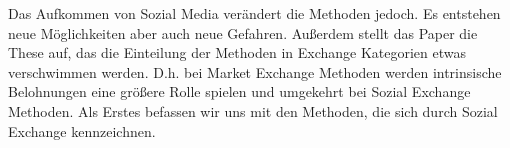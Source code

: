 Das Aufkommen von Sozial Media ver\"andert die Methoden jedoch. Es entstehen neue M\"oglichkeiten aber auch neue Gefahren. Au\ss{}erdem stellt das Paper die These auf, das die Einteilung der Methoden in Exchange Kategorien etwas verschwimmen werden. D.h. bei Market Exchange Methoden werden intrinsische Belohnungen eine gr\"o\ss{}ere Rolle spielen und umgekehrt bei Sozial Exchange Methoden. Als Erstes befassen wir uns mit den Methoden, die sich durch Sozial Exchange kennzeichnen.